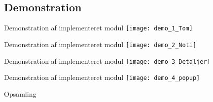 \subsection{Demonstration}
\begin{frame}{Demonstration af implementeret modul} %
\centering
\texttt{[image: demo\_1\_Tom]}
\end{frame}

\begin{frame}{Demonstration af implementeret modul} %
	\centering
	\texttt{[image: demo\_2\_Noti]}
\end{frame}

\begin{frame}{Demonstration af implementeret modul} %
	\centering
	\texttt{[image: demo\_3\_Detaljer]}
\end{frame}

\begin{frame}{Demonstration af implementeret modul} %
	\centering
	\texttt{[image: demo\_4\_popup]}
\end{frame}

\begin{frame}{Opsamling}
	
\end{frame}